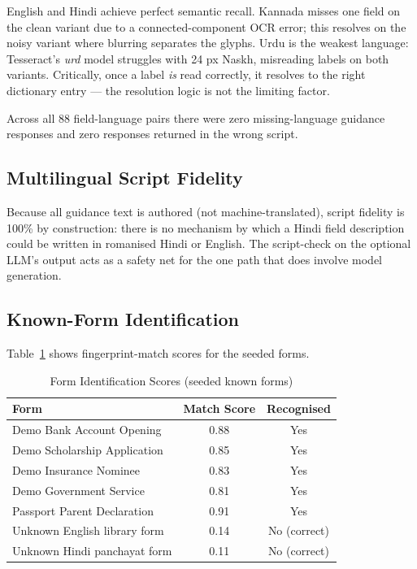 \documentclass[conference]{IEEEtran}
\begin{document}
English and Hindi achieve perfect semantic recall. Kannada misses one field on the clean variant due to a connected-component OCR error; this resolves on the noisy variant where blurring separates the glyphs. Urdu is the weakest language: Tesseract's \textit{urd} model struggles with 24 px Naskh, misreading labels on both variants. Critically, once a label \emph{is} read correctly, it resolves to the right dictionary entry — the resolution logic is not the limiting factor.

Across all 88 field-language pairs there were zero missing-language guidance responses and zero responses returned in the wrong script.

\subsection{Multilingual Script Fidelity}

Because all guidance text is authored (not machine-translated), script fidelity is 100\% by construction: there is no mechanism by which a Hindi field description could be written in romanised Hindi or English. The script-check on the optional LLM's output acts as a safety net for the one path that does involve model generation.

\subsection{Known-Form Identification}

Table~\ref{tab:formid} shows fingerprint-match scores for the seeded forms.

\begin{table}[htbp]
\caption{Form Identification Scores (seeded known forms)}
\label{tab:formid}
\centering
\small
\begin{tabular}{@{}lcc@{}}
\toprule
\textbf{Form} & \textbf{Match Score} & \textbf{Recognised} \\
\midrule
Demo Bank Account Opening    & 0.88 & Yes \\
Demo Scholarship Application & 0.85 & Yes \\
Demo Insurance Nominee       & 0.83 & Yes \\
Demo Government Service      & 0.81 & Yes \\
Passport Parent Declaration  & 0.91 & Yes \\
\midrule
Unknown English library form & 0.14 & No (correct) \\
Unknown Hindi panchayat form & 0.11 & No (correct) \\
\bottomrule
\end{tabular}
\end{table}
\end{document}
